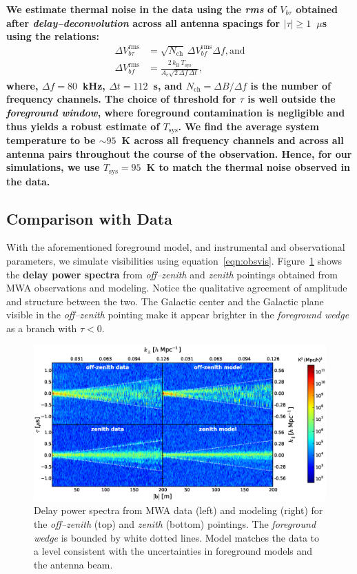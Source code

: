 \documentclass[preprint2,iop,numberedappendix]{emulateapj}
\begin{document}
{\bf We estimate thermal noise in the data using the {\it rms} of $V_{b\tau}$ obtained after {\it delay--deconvolution} across all antenna spacings for $|\tau| \geq 1$~$\mu$s using the relations:
\begin{align}\label{eqn:Tsys}
  \Delta V_{b\tau}^\textrm{rms} &= \sqrt{N_\textrm{ch}}\,\Delta V_{bf}^\textrm{rms} \Delta f, \textrm{and} \\
  \Delta V_{bf}^\textrm{rms} &= \frac{2\,k_\textrm{B}\,T_\textrm{sys}}{A_\textrm{e}\sqrt{2\,\Delta f\,\Delta t}},
\end{align}
where, $\Delta f = 80$~kHz, $\Delta t = 112$~s, and $N_\textrm{ch}=\Delta B/\Delta f$ is the number of frequency channels. The choice of threshold for $\tau$ is well outside the {\it foreground window}, where foreground contamination is negligible and thus yields a robust estimate of $T_\textrm{sys}$. We find the average system temperature to be $\sim 95$~K across all frequency channels and across all antenna pairs throughout the course of the observation. Hence, for our simulations, we use $T_\textrm{sys}=95$~K to match the thermal noise observed in the data.} 

\subsection{Comparison with Data}\label{sec:data-vs-model}

With the aforementioned foreground model, and instrumental and observational parameters, we simulate visibilities using equation~\ref{eqn:obsvis}. Figure~\ref{fig:fhd-sim-comparison} shows the {\bf delay power spectra} from {\it off--zenith} and {\it zenith} pointings obtained from MWA observations and modeling. Notice the qualitative agreement of amplitude and structure between the two. The Galactic center and the Galactic plane visible in the {\it off--zenith} pointing make it appear brighter in the {\it foreground wedge} as a branch with $\tau<0$. 

\begin{figure}[htb]
\centering
\includegraphics[width=\linewidth]{figure7.eps}
\caption{Delay power spectra from MWA data (left) and modeling (right) for the {\it off--zenith} (top) and {\it zenith} (bottom) pointings. The {\it foreground wedge} is bounded by white dotted lines. Model matches the data to a level consistent with the uncertainties in foreground models and the antenna beam. \label{fig:fhd-sim-comparison}}
\end{figure}
\end{document}
